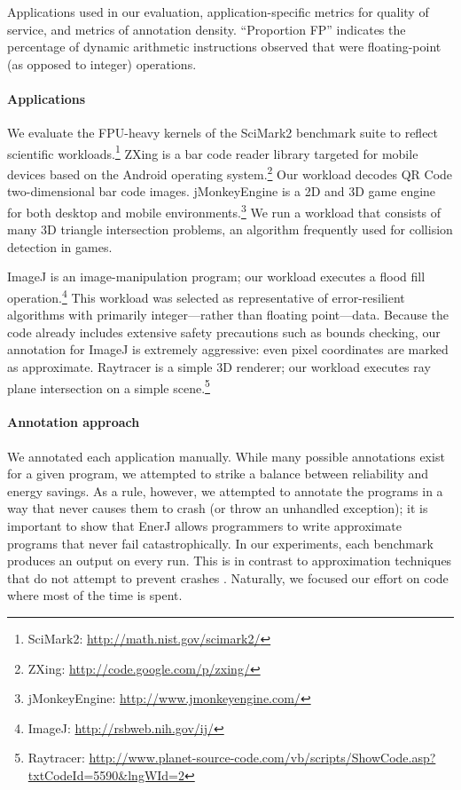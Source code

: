 \begin{table}
\footnotesize
\makebox[\textwidth][c]{%
%
}
\caption{Applications used in our evaluation,
application-specific metrics for quality of service, and
metrics of annotation density. ``Proportion FP''
indicates the percentage of dynamic arithmetic instructions observed that were
floating-point (as opposed to integer) operations.
}
\label{enerj:table:applications}
\end{table}

\paragraph{Applications} We evaluate the FPU-heavy kernels of the SciMark2 benchmark suite to
reflect scientific workloads.\footnote{SciMark2:
  \url{http://math.nist.gov/scimark2/}} ZXing is a bar code reader library
targeted for mobile devices based on the Android operating
system.\footnote{ZXing: \url{http://code.google.com/p/zxing/}} Our workload
decodes QR Code two-dimensional bar code images. jMonkeyEngine is a 2D
and 3D game engine for both desktop and mobile
environments.\footnote{jMonkeyEngine: \url{http://www.jmonkeyengine.com/}}
We run a workload that consists of many 3D triangle intersection
problems, an algorithm frequently used for collision detection in
games.

ImageJ is an image-manipulation program; our workload executes a flood fill
operation.\footnote{ImageJ: \url{http://rsbweb.nih.gov/ij/}} This workload was
selected as representative of error-resilient algorithms with primarily
integer---rather than floating point---data.
Because the code already includes extensive
safety precautions such as bounds checking, our annotation for ImageJ is
extremely aggressive: even pixel coordinates are marked as approximate.
Raytracer is a simple 3D renderer; our workload executes
ray plane intersection on a simple scene.\footnote{Raytracer:
\url{http://www.planet-source-code.com/vb/scripts/ShowCode.asp?txtCodeId=5590&lngWId=2}}

\paragraph{Annotation approach} We annotated each application
manually. While many possible
annotations exist for a given program, we attempted to strike a
balance between reliability and energy savings. As a rule, however, we
attempted to annotate the programs in a way that never causes
them to crash (or throw an unhandled exception); it is important to
show that EnerJ allows programmers to write approximate programs that
never fail catastrophically. In our experiments, each benchmark produces
an output on every run. This is in contrast to approximation techniques
that do not attempt to prevent crashes \cite{flikker, wong-selse06, li07}.
Naturally, we focused our effort on code where most of the
time is spent.

